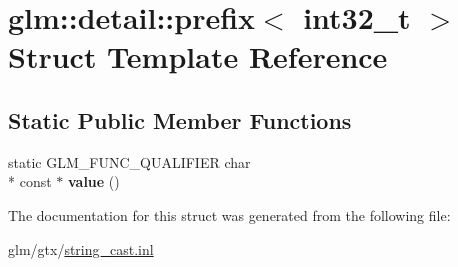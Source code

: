 \hypertarget{structglm_1_1detail_1_1prefix_3_01int32__t_01_4}{\section{glm\-:\-:detail\-:\-:prefix$<$ int32\-\_\-t $>$ Struct Template Reference}
\label{structglm_1_1detail_1_1prefix_3_01int32__t_01_4}
}
\subsection*{Static Public Member Functions}
\begin{DoxyCompactItemize}
\item 
\hypertarget{structglm_1_1detail_1_1prefix_3_01int32__t_01_4_a1e2bfac810e1195fa173ebca0dcdca57}{static G\-L\-M\-\_\-\-F\-U\-N\-C\-\_\-\-Q\-U\-A\-L\-I\-F\-I\-E\-R char \\*
const $\ast$ {\bfseries value} ()}\label{structglm_1_1detail_1_1prefix_3_01int32__t_01_4_a1e2bfac810e1195fa173ebca0dcdca57}

\end{DoxyCompactItemize}


The documentation for this struct was generated from the following file\-:\begin{DoxyCompactItemize}
\item 
glm/gtx/\hyperlink{string__cast_8inl}{string\-\_\-cast.\-inl}\end{DoxyCompactItemize}
